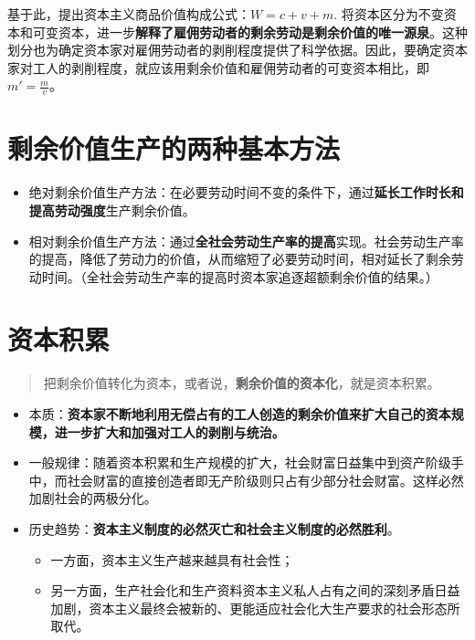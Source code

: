 \documentclass[
]{article}
\begin{document}
基于此，提出资本主义商品价值构成公式：\(W =c+v+m\).
将资本区分为不变资本和可变资本，进一步\textbf{解释了雇佣劳动者的剩余劳动是剩余价值的唯一源泉}。这种划分也为确定资本家对雇佣劳动者的剥削程度提供了科学依据。因此，要确定资本家对工人的剥削程度，就应该用剩余价值和雇佣劳动者的可变资本相比，即\(m' = \frac{m}{v}\)。

\hypertarget{ux5269ux4f59ux4ef7ux503cux751fux4ea7ux7684ux4e24ux79cdux57faux672cux65b9ux6cd5}{%
\section{剩余价值生产的两种基本方法}\label{ux5269ux4f59ux4ef7ux503cux751fux4ea7ux7684ux4e24ux79cdux57faux672cux65b9ux6cd5}}

\begin{itemize}
\item
  绝对剩余价值生产方法：在必要劳动时间不变的条件下，通过\textbf{延长工作时长和提高劳动强度}生产剩余价值。
\item
  相对剩余价值生产方法：通过\textbf{全社会劳动生产率的提高}实现。社会劳动生产率的提高，降低了劳动力的价值，从而缩短了必要劳动时间，相对延长了剩余劳动时间。（全社会劳动生产率的提高时资本家追逐超额剩余价值的结果。）
\end{itemize}

\hypertarget{ux8d44ux672cux79efux7d2f}{%
\section{资本积累}\label{ux8d44ux672cux79efux7d2f}}

\begin{quote}
把剩余价值转化为资本，或者说，\textbf{剩余价值的资本化}，就是资本积累。
\end{quote}

\begin{itemize}
\item
  本质：\textbf{资本家不断地利用无偿占有的工人创造的剩余价值来扩大自己的资本规模，进一步扩大和加强对工人的剥削与统治。}
\item
  一般规律：随着资本积累和生产规模的扩大，社会财富日益集中到资产阶级手中，而社会财富的直接创造者即无产阶级则只占有少部分社会财富。这样必然加剧社会的两极分化。
\item
  历史趋势：\textbf{资本主义制度的必然灭亡和社会主义制度的必然胜利}。

  \begin{itemize}
  \item
    一方面，资本主义生产越来越具有社会性；
  \item
    另一方面，生产社会化和生产资料资本主义私人占有之间的深刻矛盾日益加剧，资本主义最终会被新的、更能适应社会化大生产要求的社会形态所取代。
  \end{itemize}
\end{itemize}
\end{document}
